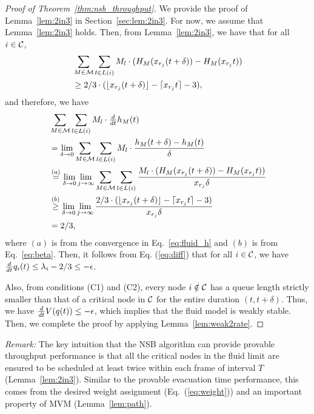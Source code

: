 \documentclass[10pt,journal,compsoc]{IEEEtran}
\newcommand{\high}[1]{{\color{black}{#1}}}
\begin{document}
\begin{proof}[Proof of Theorem~\ref{thm:nsb_throughput}]
We provide the proof of Lemma~\ref{lem:2in3} in Section~\ref{sec:lem:2in3}.
For now, we assume that Lemma~\ref{lem:2in3} holds. \high{Note that interval $T$ 
contains at least $(\lfloor \xrj (t+\delta) \rfloor - \lceil \xrj t \rceil - 3)/3$ complete frames.}
Then, from Lemma~\ref{lem:2in3}, we have that for all $i \in \mathcal{C}$,
\begin{equation}
\label{eq:beta}
\begin{split}
& \sum_{M \in \mathcal{M}} \sum_{l \in L(i)} M_l \cdot (H_M({x_{r_j}} (t+\delta))-H_M({x_{r_j}} t)) \\
& \ge 2/3 \cdot (\lfloor {x_{r_j}} (t+\delta) \rfloor - \lceil {x_{r_j}} t \rceil - 3),
\end{split}
\end{equation}
and therefore, we have
\begin{equation}
\label{eq:dh}
\begin{split}
&\sum_{M \in \mathcal{M}} \sum_{l \in L(i)} M_l \cdot {\textstyle \frac{d}{dt}} h_M(t) \\
&= \lim_{\delta \rightarrow 0} \sum_{M \in \mathcal{M}} \sum_{l \in L(i)} M_l \cdot \frac{h_M(t+\delta)-h_M(t)}{\delta} \\
&\stackrel{(a)} = \lim_{\delta \rightarrow 0} \lim_{j \rightarrow \infty} \sum_{M \in \mathcal{M}} \sum_{l \in L(i)} \frac{M_l \cdot (H_M({x_{r_j}} (t+\delta))-H_M({x_{r_j}} t))}{{x_{r_j}} \delta} \\
&\stackrel{(b)} \ge \lim_{\delta \rightarrow 0} \lim_{j \rightarrow \infty} \frac{2/3 \cdot (\lfloor {x_{r_j}} (t+\delta) \rfloor - \lceil {x_{r_j}} t \rceil - 3)}{{x_{r_j}} \delta} \\
&= 2/3,
\end{split}
\end{equation}
where $(a)$ is from the convergence in Eq.~\eqref{eq:fluid_h} and $(b)$ is from Eq.~\eqref{eq:beta}. 
Then, it follows from Eq. (\ref{eq:diff}) that for all $i \in \mathcal{C}$, we have ${\textstyle \frac{d}{dt}} q_i(t) \le \lambda_i - 2/3 \le -\epsilon$.

Also, from conditions (C1) and (C2), every node $i \notin \mathcal{C}$ has a queue length strictly smaller 
than that of a critical node in $\mathcal{C}$ for the entire duration $(t, t+\delta)$. Thus, we have
${\textstyle \frac{d}{dt}} V(q(t)) \le - \epsilon$, which implies that the fluid model is weakly stable. Then, we complete 
the proof by applying Lemma~\ref{lem:weak2rate}.
\end{proof}

\emph{Remark:} The key intuition that the NSB algorithm can provide provable throughput performance 
is that all the critical nodes in the fluid limit are ensured to be scheduled at least twice within each frame of 
interval $T$ (Lemma~\ref{lem:2in3}). Similar to the provable evacuation time performance, this comes from 
the desired weight assignment (Eq.~(\ref{eq:weight})) and an important property of MVM (Lemma~\ref{lem:path}).
\end{document}
